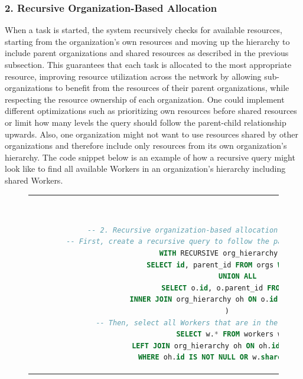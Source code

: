 \subsubsection{2. Recursive Organization-Based Allocation}
    When a task is started, the system recursively checks for available resources, starting from the organization's own resources and moving up the hierarchy to include parent organizations and shared resources as described in the previous subsection. This guarantees that each task is allocated to the most appropriate resource, improving resource utilization across the network by allowing sub-organizations to benefit from the resources of their parent organizations, while respecting the resource ownership of each organization. One could implement different optimizations such as prioritizing own resources before shared resources or limit how many levels the query should follow the parent-child relationship upwards. Also, one organization might not want to use resources shared by other organizations and therefore include only resources from its own organization's hierarchy. The code snippet below is an example of how a recursive query might look like to find all available Workers in an organization's hierarchy including shared Workers.   

    \begin{figure}[htpb]
      \begin{tabular}{c}
      \ \small \begin{lstlisting}[language=SQL]
        -- 2. Recursive organization-based allocation example query
        -- First, create a recursive query to follow the parent-child hiarachy upward
        WITH RECURSIVE org_hierarchy AS (
            SELECT id, parent_id FROM orgs WHERE id = ?
            UNION ALL
            SELECT o.id, o.parent_id FROM orgs o
            INNER JOIN org_hierarchy oh ON o.id = oh.parent_id 
        ) 
        -- Then, select all Workers that are in the hiararchy or shared
        SELECT w.* FROM workers w
        LEFT JOIN org_hierarchy oh ON oh.id = w.org_id
        WHERE oh.id IS NOT NULL OR w.shared = true;
        \end{lstlisting}
      \end{tabular}
      \label{fig:recursive-allocation}
    \end{figure}

